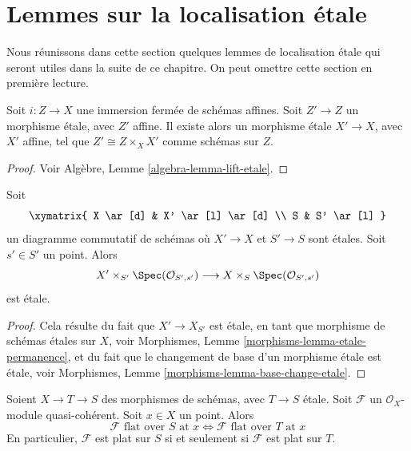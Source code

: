 \section{Lemmes sur la localisation \'etale}
\label{section-etale-localization}

\noindent
Nous réunissons dans cette section quelques lemmes de localisation \'etale qui seront
utiles dans la suite de ce chapitre. On peut omettre cette section en première lecture.

\begin{lemma}
\label{lemma-lift-etale}
Soit $i : Z \to X$ une immersion fermée de schémas affines.
Soit $Z' \to Z$ un morphisme \'etale, avec $Z'$ affine.
Il existe alors un morphisme \'etale $X' \to X$, avec $X'$
affine, tel que $Z' \cong Z \times_X X'$ comme schémas sur $Z$.
\end{lemma}

\begin{proof}
Voir
Algèbre, Lemme \ref{algebra-lemma-lift-etale}.
\end{proof}

\begin{lemma}
\label{lemma-etale-at-point}
Soit
$$
\xymatrix{
X \ar[d] & X' \ar[l] \ar[d] \\
S & S' \ar[l]
}
$$
un diagramme commutatif de schémas où $X' \to X$ et $S' \to S$ sont \'etales.
Soit $s' \in S'$ un point. Alors
$$
X' \times_{S'} \Spec(\mathcal{O}_{S', s'})
\longrightarrow
X \times_S \Spec(\mathcal{O}_{S', s'})
$$
est \'etale.
\end{lemma}

\begin{proof}
Cela résulte du fait que $X' \to X_{S'}$ est \'etale, en tant que morphisme de
schémas \'etales sur $X$, voir
Morphismes, Lemme \ref{morphisms-lemma-etale-permanence},
et du fait que le changement de base d'un morphisme \'etale est \'etale, voir
Morphismes, Lemme \ref{morphisms-lemma-base-change-etale}.
\end{proof}

\begin{lemma}
\label{lemma-etale-flat-up-down}
Soient $X \to T \to S$ des morphismes de schémas, avec $T \to S$ \'etale.
Soit $\mathcal{F}$ un $\mathcal{O}_X$-module quasi-cohérent.
Soit $x \in X$ un point. Alors
$$
\mathcal{F}\text{ flat over }S\text{ at }x
\Leftrightarrow
\mathcal{F}\text{ flat over }T\text{ at }x
$$
En particulier, $\mathcal{F}$ est plat sur $S$ si et seulement si $\mathcal{F}$
est plat sur $T$.
\end{lemma}

